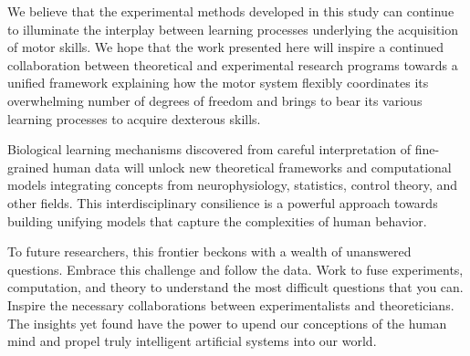\documentclass[../main.tex]{subfiles}
\begin{document}
We believe that the experimental methods developed in this study can continue to illuminate the interplay between learning processes underlying the acquisition of motor skills. We hope that the work presented here will inspire a continued collaboration between theoretical and experimental research programs towards a unified framework explaining how the motor system flexibly coordinates its overwhelming number of degrees of freedom and brings to bear its various learning processes to acquire dexterous skills.

Biological learning mechanisms discovered from careful interpretation of fine-grained human data will unlock new theoretical frameworks and computational models integrating concepts from neurophysiology, statistics, control theory, and other fields. This interdisciplinary consilience is a powerful approach towards building unifying models that capture the complexities of human behavior.

To future researchers, this frontier beckons with a wealth of unanswered questions. Embrace this challenge and follow the data. Work to fuse experiments, computation, and theory to understand the most difficult questions that you can. Inspire the necessary collaborations between experimentalists and theoreticians. The insights yet found have the power to upend our conceptions of the human mind and propel truly intelligent artificial systems into our world.





















\end{document}
